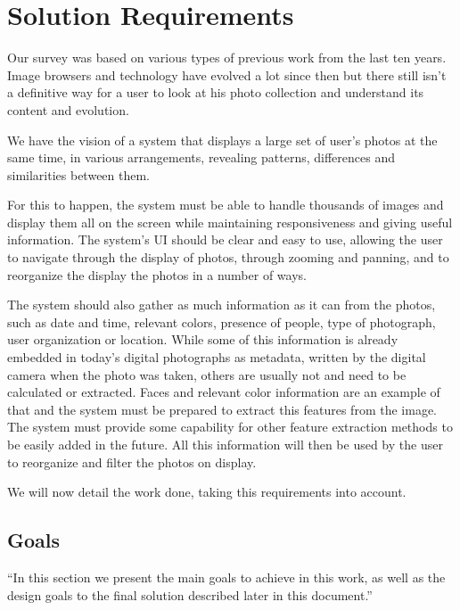 \chapter{Solution Requirements} %
\label{chapter:solution_requirements}


Our survey was based on various types of previous work from the last ten years. Image browsers and technology have evolved a lot since then but there still isn't a definitive way for a user to look at his photo collection and understand its content and evolution. 

We have the vision of a system that displays a large set of user’s photos at the same time, in various arrangements, revealing patterns, differences and similarities between them.

For this to happen, the system must be able to handle thousands of images and display them all on the screen while maintaining responsiveness and giving useful information. The system's \ac{UI} should be clear and easy to use, allowing the user to navigate through the display of photos, through zooming and panning, and to reorganize the display the photos in a number of ways.

The system should also gather as much information as it can from the photos, such as date and time, relevant colors, presence of people, type of photograph, user organization or location. While some of this information is already embedded in today's digital photographs as metadata, written by the digital camera when the photo was taken, others are usually not and need to be calculated or extracted. Faces and relevant color information are an example of that and the system must be prepared to extract this features from the image. The system must provide some capability for other feature extraction methods to be easily added in the future. All this information will then be used by the user to reorganize and filter the photos on display.


We will now detail the work done, taking this requirements into account.


\section{Goals} %
\label{sec:goals}

``In this section we present the main goals to achieve in this work, as well as the design goals to the final solution described later in this document.''


